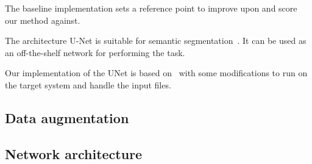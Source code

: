 The baseline implementation sets a reference point to improve upon and score our method against.

The architecture U-Net is suitable for semantic segmentation~\cite{RonnebergerFB15}.
It can be used as an off-the-shelf network for performing the task.

Our implementation of the UNet is based on~\cite{GH-Pytorch-UNet2018} with some modifications to run on the target system and handle the input files.

\subsection{Data augmentation}
\label{subsec:data-augmentation}


\subsection{Network architecture}
\label{subsec:network-architecture}